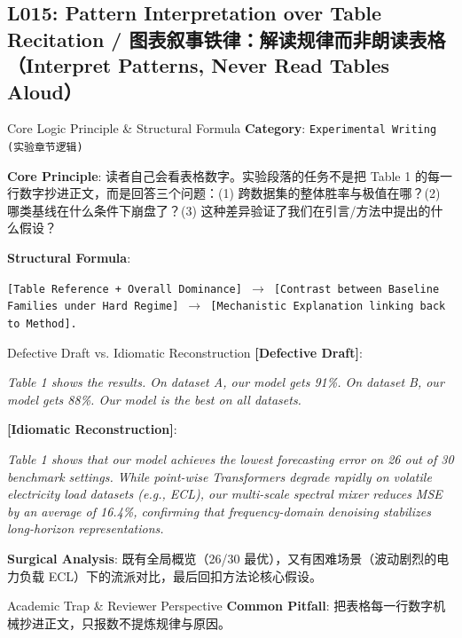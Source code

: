 \subsection{L015: Pattern Interpretation over Table Recitation / 图表叙事铁律：解读规律而非朗读表格（Interpret Patterns, Never Read Tables Aloud）}\label{sec:logic:L015}
\begin{ConceptBox}{Core Logic Principle \& Structural Formula}
\textbf{Category}: \texttt{Experimental Writing (实验章节逻辑)}\par\vspace{3pt}
\textbf{Core Principle}: 读者自己会看表格数字。实验段落的任务不是把 Table 1 的每一行数字抄进正文，而是回答三个问题：(1)  跨数据集的整体胜率与极值在哪？(2)  哪类基线在什么条件下崩盘了？(3)  这种差异验证了我们在引言/方法中提出的什么假设？\par\vspace{4pt}
\textbf{Structural Formula}:\par\noindent\texttt{[Table Reference + Overall Dominance] $\to$ [Contrast between Baseline Families under Hard Regime] $\to$ [Mechanistic Explanation linking back to Method].}
\end{ConceptBox}
\begin{ExampleBox}{Defective Draft vs. Idiomatic Reconstruction}
\textbf{\color{TargetHighlight}[Defective Draft]}:\par\textit{Table 1 shows the results. On dataset A, our model gets 91\%. On dataset B, our model gets 88\%. Our model is the best on all datasets.}\par\vspace{4pt}
\textbf{\color{AcadNavy}[Idiomatic Reconstruction]}:\par\textit{Table 1 shows that our model achieves the lowest forecasting error on 26 out of 30 benchmark settings. While point-wise Transformers degrade rapidly on volatile electricity load datasets (e.g., ECL), our multi-scale spectral mixer reduces MSE by an average of 16.4\%, confirming that frequency-domain denoising stabilizes long-horizon representations.}\par\vspace{4pt}
\textbf{Surgical Analysis}: 既有全局概览（26/30 最优），又有困难场景（波动剧烈的电力负载 ECL）下的流派对比，最后回扣方法论核心假设。
\end{ExampleBox}
\begin{TipBox}{Academic Trap \& Reviewer Perspective}
\textbf{Common Pitfall}: 把表格每一行数字机械抄进正文，只报数不提炼规律与原因。
\end{TipBox}
\vspace{6pt}
